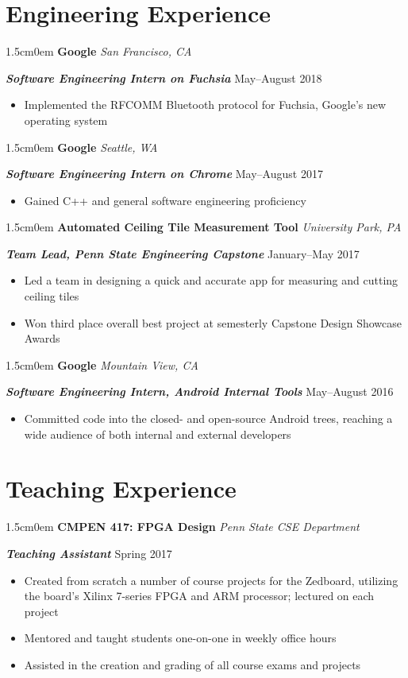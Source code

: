 \documentclass[letterpaper]{article}
\newcommand{\primaryindent}{1.5cm} %
\newenvironment{indented}{\begin{adjustwidth}{\primaryindent}{0em}}{\end{adjustwidth}}
\newenvironment{resumelist}{\begin{itemize}[topsep=0pt,noitemsep,itemindent=-15pt,leftmargin=30pt]}{\end{itemize}}
\newcommand{\generalentry}[5]{
	\begin{indented}
		\Large \textsf{\textbf{#1}} \hfill	%
			\hfill\normalsize\textit{#2} \par  			%
		\noindent \large \textsf{\textbf{\textit{#3}}} 	%
			\hfill \normalsize #4\par 					%
		\normalsize \normalfont #5 \par					%
		\normalsize \normalfont
	\end{indented}
	}
\begin{document}

\section*{Engineering Experience}
\generalentry{Google}{San Francisco, CA}{Software Engineering Intern on Fuchsia}{May--August 2018}{
	\begin{resumelist}
		\item Implemented the RFCOMM Bluetooth protocol for Fuchsia, Google's new operating system
	\end{resumelist}
}
\vspace{3mm} %

\generalentry{Google}{Seattle, WA}{Software Engineering Intern on Chrome}{May--August 2017}{
	\begin{resumelist}
		\item Gained C++ and general software engineering proficiency
	\end{resumelist}
}
\vspace{3mm}
\generalentry{Automated Ceiling Tile Measurement Tool}{University Park, PA}{Team Lead, Penn State Engineering Capstone}{January--May 2017}{
	\begin{resumelist}
		\item Led a team in designing a quick and accurate app for measuring and cutting ceiling tiles
		\item Won third place overall best project at semesterly Capstone Design Showcase Awards 
	\end{resumelist}
}

\vspace{3mm}


\generalentry{Google}{Mountain View, CA}{Software Engineering Intern, Android Internal Tools}{May--August 2016}{
	\begin{resumelist}
		\item Committed code into the closed- and open-source Android trees, reaching a wide audience of both internal and external developers
	\end{resumelist}
}

\section*{Teaching Experience}

\generalentry{CMPEN 417: FPGA Design}{Penn State CSE Department}{Teaching Assistant}{Spring 2017}{
	\begin{resumelist}
		\item Created from scratch a number of course projects for the Zedboard, utilizing the board's Xilinx 7-series FPGA and ARM processor; lectured on each project
		\item Mentored and taught students one-on-one in weekly office hours
		\item Assisted in the creation and grading of all course exams and projects
	\end{resumelist}
}
\end{document}
